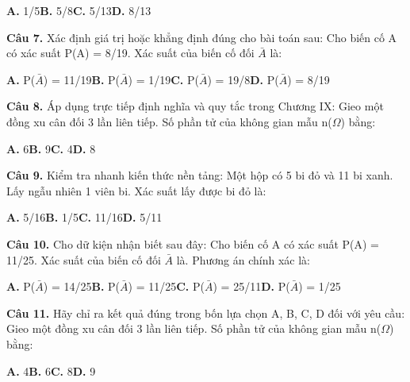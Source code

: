 \documentclass[11pt,a4paper]{article}
\begin{document}
\hspace*{1.5em}\textbf{A.} 1/5\quad\quad \textbf{B.} 5/8\quad\quad \textbf{C.} 5/13\quad\quad \textbf{D.} 8/13\par\vspace{2pt}
\textbf{\color{primary} Câu 7.} Xác định giá trị hoặc khẳng định đúng cho bài toán sau: Cho biến cố A có xác suất P(A) = 8/19. Xác suất của biến cố đối $\bar{A}$ là:\par
\hspace*{1.5em}\textbf{A.} P($\bar{A}$) = 11/19\quad\quad \textbf{B.} P($\bar{A}$) = 1/19\quad\quad \textbf{C.} P($\bar{A}$) = 19/8\quad\quad \textbf{D.} P($\bar{A}$) = 8/19\par\vspace{2pt}
\textbf{\color{primary} Câu 8.} Áp dụng trực tiếp định nghĩa và quy tắc trong Chương IX: Gieo một đồng xu cân đối 3 lần liên tiếp. Số phần tử của không gian mẫu n($\Omega$) bằng:\par
\hspace*{1.5em}\textbf{A.} 6\quad\quad \textbf{B.} 9\quad\quad \textbf{C.} 4\quad\quad \textbf{D.} 8\par\vspace{2pt}
\textbf{\color{primary} Câu 9.} Kiểm tra nhanh kiến thức nền tảng: Một hộp có 5 bi đỏ và 11 bi xanh. Lấy ngẫu nhiên 1 viên bi. Xác suất lấy được bi đỏ là:\par
\hspace*{1.5em}\textbf{A.} 5/16\quad\quad \textbf{B.} 1/5\quad\quad \textbf{C.} 11/16\quad\quad \textbf{D.} 5/11\par\vspace{2pt}
\textbf{\color{primary} Câu 10.} Cho dữ kiện nhận biết sau đây: Cho biến cố A có xác suất P(A) = 11/25. Xác suất của biến cố đối $\bar{A}$ là. Phương án chính xác là:\par
\hspace*{1.5em}\textbf{A.} P($\bar{A}$) = 14/25\quad\quad \textbf{B.} P($\bar{A}$) = 11/25\quad\quad \textbf{C.} P($\bar{A}$) = 25/11\quad\quad \textbf{D.} P($\bar{A}$) = 1/25\par\vspace{2pt}
\textbf{\color{primary} Câu 11.} Hãy chỉ ra kết quả đúng trong bốn lựa chọn A, B, C, D đối với yêu cầu: Gieo một đồng xu cân đối 3 lần liên tiếp. Số phần tử của không gian mẫu n($\Omega$) bằng:\par
\hspace*{1.5em}\textbf{A.} 4\quad\quad \textbf{B.} 6\quad\quad \textbf{C.} 8\quad\quad \textbf{D.} 9\par\vspace{2pt}
\end{document}
